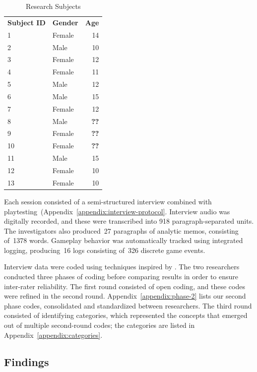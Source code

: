 \documentclass[letterpaper]{article}
\begin{document}
\begin{table}
\begin{framed}
\centering
\begin{tabular}{llr}
\textbf{Subject ID} & \textbf{Gender} & \textbf{Age}\\
1 & Female & 14\\
2 & Male & 10\\
3 & Female & 12\\
4 & Female & 11\\
5 & Male & 12\\
6 & Male & 15\\
7 & Female & 12\\
8 & Male & \textbf{??}\\
9 & Female & \textbf{??}\\
10 & Female & \textbf{??}\\
11 & Male & 15\\
12 & Female & 10\\
13 & Female & 10\\
\end{tabular}
\caption{Research Subjects}
\end{framed}
\end{table}

Each session consisted of a semi-structured interview combined with
playtesting~(Appendix~\ref{appendix:interview-protocol}.
Interview audio was digitally recorded, and these were transcribed
into 918 paragraph-separated units. 
The investigators also 
produced~27 paragraphs of analytic memos,
consisting of~1378 words.
Gameplay behavior was automatically tracked using integrated logging, 
producing~16 logs consisting of~326 discrete game events.

Interview data were coded using techniques inspired by
\citet{Saldana2009}. The two researchers conducted three phases 
of coding before comparing results in order to ensure inter-rater
reliability. The first round consisted of open coding, and these
codes were refined in the second round. 
Appendix~\ref{appendix:phase-2} lists our second phase codes,
consolidated and standardized between researchers.
The third round consisted of
identifying categories, which represented the concepts that emerged
out of multiple second-round codes; the categories are listed in
Appendix~\ref{appendix:categories}.

\subsection{Findings}
\end{document}
